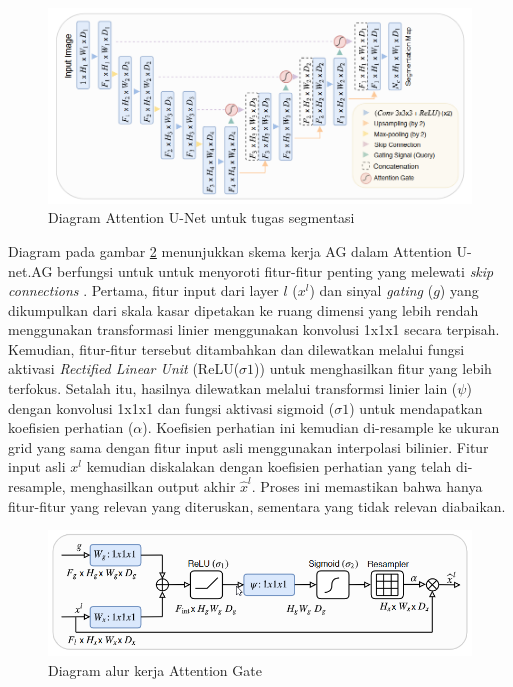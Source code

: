 \begin{figure}[H]
	\centering
	\includegraphics[scale=.5]{gambar/AG-U.png}
	\caption{Diagram Attention U-Net untuk tugas segmentasi \cite{oktay_attention_2018}}
	\label{fig:Attention-U-net}
\end{figure}



Diagram pada gambar \ref{fig:AG} menunjukkan skema kerja AG dalam Attention U-net.AG berfungsi untuk untuk menyoroti fitur-fitur penting yang melewati \textit{skip connections} \cite{siddique_u-net_2020,oktay_attention_2018}. Pertama, fitur input dari layer \(l\) (\(x^l\))  dan sinyal \textit{gating} (\(g\)) yang dikumpulkan dari skala kasar dipetakan ke ruang dimensi yang lebih rendah menggunakan transformasi linier menggunakan konvolusi 1x1x1 secara terpisah. Kemudian, fitur-fitur tersebut ditambahkan dan dilewatkan melalui fungsi aktivasi \textit{Rectified Linear Unit} (ReLU($\sigma1$)) untuk menghasilkan fitur yang lebih terfokus. Setalah itu, hasilnya dilewatkan melalui transformsi linier lain ($\psi$) dengan konvolusi 1x1x1 dan fungsi aktivasi sigmoid ($\sigma1$) untuk mendapatkan koefisien perhatian ($\alpha$). Koefisien perhatian ini kemudian di-resample ke ukuran grid yang sama dengan fitur input asli menggunakan interpolasi bilinier. Fitur input asli \(x^l\) kemudian diskalakan dengan koefisien perhatian yang telah di-resample, menghasilkan output akhir $\hat{x}^l$. Proses ini memastikan bahwa hanya fitur-fitur yang relevan yang diteruskan, sementara yang tidak relevan diabaikan.

\begin{figure}[H]
	\centering
	\includegraphics[scale=.5]{gambar/AG.png}
	\caption{Diagram alur kerja Attention Gate \cite{oktay_attention_2018}}
	\label{fig:AG}
\end{figure}


